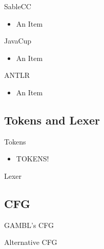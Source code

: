 \begin{frame}{SableCC}
  \begin{itemize}
    \item An Item
  \end{itemize}
\end{frame}

\begin{frame}{JavaCup}
  \begin{itemize}
    \item An Item
  \end{itemize}
\end{frame}

\begin{frame}{ANTLR}
  \begin{itemize}
    \item An Item
  \end{itemize}
\end{frame}

\subsection{Tokens and Lexer}
\begin{frame}{Tokens}
  \begin{itemize}
    \item TOKENS!
  \end{itemize}
\end{frame}

\begin{frame}{Lexer}

\end{frame}


\subsection{CFG}
\begin{frame}{GAMBL's CFG}

\end{frame}

\begin{frame}{Alternative CFG}

\end{frame}